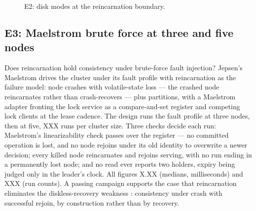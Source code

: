 \documentclass[10pt,journal,letterpaper]{IEEEtran}
\begin{document}
\begin{figure}[t]
\centering
{}
\caption{E2: disk modes at the reincarnation boundary.}
\label{fig:e2}
\end{figure}

\subsection{E3: Maelstrom brute force at three and five nodes}
Does reincarnation hold consistency under brute-force fault injection? Jepsen's Maelstrom drives the cluster under its fault
profile with reincarnation as the failure model: node crashes with
volatile-state loss --- the crashed node reincarnates rather than
crash-recovers --- plus partitions, with a Maelstrom adapter fronting the
lock service as a compare-and-set register and competing lock clients at
the lease cadence. The design runs the fault profile at three nodes, then
at five, $\mathrm{XXX}$ runs per cluster size. Three checks decide each
run: Maelstrom's linearizability check passes over the register --- no
committed operation is lost, and no node rejoins under its old identity to
overwrite a newer decision; every killed node reincarnates and rejoins
serving, with no run ending in a permanently lost node; and no read ever
reports two holders, expiry being judged only in the leader's clock. All
figures X.XX (medians, milliseconds) and $\mathrm{XXX}$ (run counts). A passing campaign supports the case that
reincarnation eliminates the diskless-recovery weakness \cite{diskless}:
consistency under crash with
successful rejoin, by construction rather than by recovery.
\end{document}
